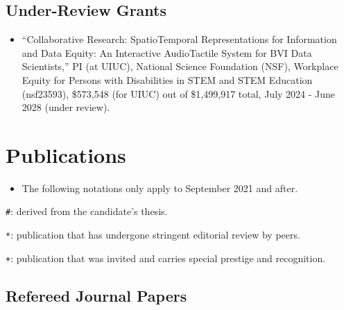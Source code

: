 \documentclass[11pt,a4paper,]{awesome-cv}
\providecommand{\tightlist}{%
	\setlength{\itemsep}{0pt}\setlength{\parskip}{0pt}}
\begin{document}
\subsection{Under-Review Grants}\label{under-review-grants}

\begin{itemize}
\tightlist
\item
  ``Collaborative Research: SpatioTemporal Representations for
  Information and Data Equity: An Interactive AudioTactile System for
  BVI Data Scientists,'' PI (at UIUC), National Science Foundation
  (NSF), Workplace Equity for Persons with Disabilities in STEM and STEM
  Education (nsf23593), \$573,548 (for UIUC) out of \$1,499,917 total,
  July 2024 - June 2028 (under review).
\end{itemize}

\section{Publications}\label{publications}

\begin{itemize}
\tightlist
\item
  The following notations only apply to September 2021 and after.
\end{itemize}

\texttt{\#}: derived from the candidate's thesis.

\texttt{*}: publication that has undergone stringent editorial review by
peers.

\texttt{+}: publication that was invited and carries special prestige
and recognition.

\subsection{Refereed Journal Papers}\label{refereed-journal-papers}
\end{document}
